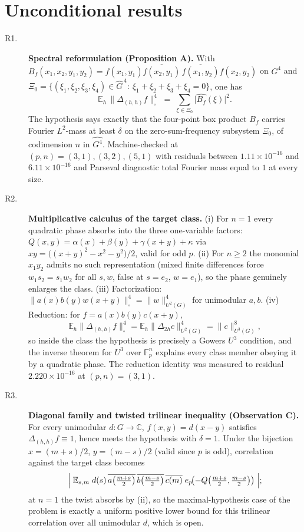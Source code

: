 \documentclass[11pt]{article}
\begin{document}
\section*{Unconditional results}
\begin{description}
\item[R1.] \textbf{Spectral reformulation (Proposition A).} With $B_f(x_1,x_2,y_1,y_2)=f(x_1,y_1)\overline{f(x_2,y_1)}\,\overline{f(x_1,y_2)}f(x_2,y_2)$ on $G^4$ and $\Xi_0=\{(\xi_1,\xi_2,\xi_3,\xi_4)\in\widehat{G}^{\,4}:\ \xi_1+\xi_2+\xi_3+\xi_4=0\}$, one has $$\mathbb{E}_h\,\|\Delta_{(h,h)}f\|_\square^4\;=\;\sum_{\xi\in\Xi_0}\bigl|\widehat{B_f}(\xi)\bigr|^2.$$ The hypothesis says exactly that the four-point box product $B_f$ carries Fourier $L^2$-mass at least $\delta$ on the zero-sum-frequency subsystem $\Xi_0$, of codimension $n$ in $\widehat{G^4}$. Machine-checked at $(p,n)=(3,1),(3,2),(5,1)$ with residuals between $1.11\times10^{-16}$ and $6.11\times10^{-16}$ and Parseval diagnostic total Fourier mass equal to $1$ at every size.
\item[R2.] \textbf{Multiplicative calculus of the target class.} (i) For $n=1$ every quadratic phase absorbs into the three one-variable factors: $Q(x,y)=\alpha(x)+\beta(y)+\gamma(x+y)+\kappa$ via $xy=\bigl((x+y)^2-x^2-y^2\bigr)/2$, valid for odd $p$. (ii) For $n\ge2$ the monomial $x_1y_2$ admits no such representation (mixed finite differences force $w_1s_2=s_1w_2$ for all $s,w$, false at $s=e_2$, $w=e_1$), so the phase genuinely enlarges the class. (iii) Factorization: $\|a(x)b(y)w(x+y)\|_\square^4=\|w\|_{U^2(G)}^4$ for unimodular $a,b$. (iv) Reduction: for $f=a(x)b(y)c(x+y)$, $$\mathbb{E}_h\|\Delta_{(h,h)}f\|_\square^4=\mathbb{E}_h\|\Delta_{2h}c\|_{U^2(G)}^4=\|c\|_{U^3(G)}^8,$$ so inside the class the hypothesis is precisely a Gowers $U^3$ condition, and the inverse theorem for $U^3$ over $\mathbb{F}_p^n$ explains every class member obeying it by a quadratic phase. The reduction identity was measured to residual $2.220\times10^{-16}$ at $(p,n)=(3,1)$.
\item[R3.] \textbf{Diagonal family and twisted trilinear inequality (Observation C).} For every unimodular $d\colon G\to\mathbb{C}$, $f(x,y)=d(x-y)$ satisfies $\Delta_{(h,h)}f\equiv 1$, hence meets the hypothesis with $\delta=1$. Under the bijection $x=(m+s)/2$, $y=(m-s)/2$ (valid since $p$ is odd), correlation against the target class becomes $$\Bigl|\;\mathbb{E}_{s,m}\;d(s)\,\overline{a\bigl(\tfrac{m+s}{2}\bigr)}\,\overline{b\bigl(\tfrac{m-s}{2}\bigr)}\,\overline{c(m)}\;e_p\!\bigl(-Q\bigl(\tfrac{m+s}{2},\tfrac{m-s}{2}\bigr)\bigr)\;\Bigr|;$$ at $n=1$ the twist absorbs by (ii), so the maximal-hypothesis case of the problem is exactly a uniform positive lower bound for this trilinear correlation over all unimodular $d$, which is open.

\end{description}
\end{document}
